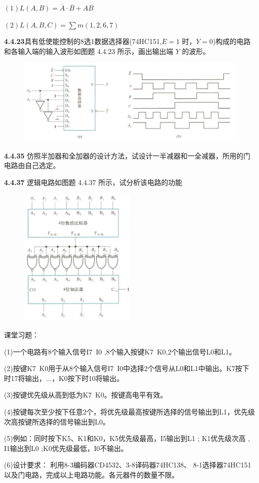 \documentclass[a4paper,11pt,UTF8]{article}
\begin{document}
$(1)L(A,B)=\overline{A}\cdot\overline{B}+AB$

$(2)L(A,B,C)=\sum m(1,2,6,7)$

\textbf{4.4.23}具有低使能控制的8选1数据选择器(74HC151,$\overline{E}={1}$ 时，$Y={0}$)构成的电路和各输入端的输入波形如图题 4.4.23 所示，画出输出端 $Y$ 的波形。
\begin{figure}[H]
	\centering
	\includegraphics[width=1\textwidth]{4.4.23}
\end{figure}
\textbf{4.4.35} 仿照半加器和全加器的设计方法，试设计一半减器和一全减器，所用的门电路由自己选定。

\textbf{4.4.37} 逻辑电路如图题 4.4.37 所示，试分析该电路的功能
\begin{figure}[H]
	\centering
	\includegraphics[width=0.5\textwidth]{4.4.37}
	\caption{}
\end{figure}
课堂习题：

(1)一个电路有8个输入信号I7~I0 ,8个输入按键K7~K0,2个输出信号L0和L1。

(2)按键K7~K0用于从8个输入信号I7~I0中选择2个信号从L0和L1中输出。K7按下时17将输出，...，K0按下时10将输出。

(3)按键优先级从高到低为K7~K0。按键高电平有效。

(4)按键每次至少按下任意2个，将优先级最高按键所选择的信号输出到L1，优先级次高按键所选择的信号输出到L0。

(5)例如：同时按下K5、K1和K0，K5优先级最高，I5输出到L1 ; K1优先级次高 , I1输出到L0 ;K0优先级最低，I0不输出。

(6)设计要求： 利用8-3编码器CD4532、3-8译码器74HC138、 8-1选择器74HC151以及门电路，完成以上电路功能。各元器件的数量不限。
\end{document}

